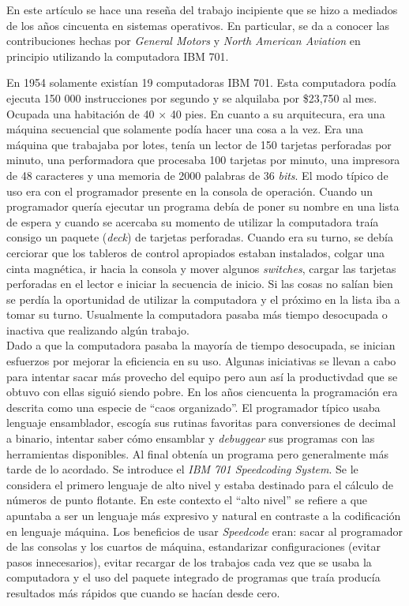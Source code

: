 En este artículo se hace una reseña del trabajo incipiente que se hizo a mediados de los años cincuenta en sistemas operativos. En particular, se da a conocer las contribuciones hechas por \textit{General Motors} y \textit{North American Aviation} en principio utilizando la computadora \textsc{IBM 701}.

En 1954 solamente existían 19 computadoras \textsc{IBM 701}. Esta computadora podía ejecuta 150 000 instrucciones por segundo y se alquilaba por \$23,750 al mes. Ocupada una habitación de 40 $\times$ 40 pies. En cuanto a su arquitecura, era una máquina secuencial que solamente podía hacer una cosa a la vez. Era una máquina que trabajaba por lotes, tenía un lector de 150 tarjetas perforadas por minuto, una performadora que procesaba 100 tarjetas por minuto, una impresora de 48 caracteres y una memoria de 2000 palabras de 36 \textit{bits}. El modo típico de uso era con el programador presente en la consola de operación. Cuando un programador quería ejecutar un programa debía de poner su nombre en una lista de espera y cuando se acercaba su momento de utilizar la computadora traía consigo un paquete (\textit{deck}) de tarjetas perforadas. Cuando era su turno, se debía cerciorar que los tableros de control apropiados estaban instalados, colgar una cinta magnética, ir hacia la consola y mover algunos \textit{switches}, cargar las tarjetas perforadas en el lector e iniciar la secuencia de inicio. Si las cosas no salían bien se perdía la oportunidad de utilizar la computadora y el próximo en la lista iba a tomar su turno. Usualmente la computadora pasaba más tiempo desocupada o inactiva que realizando algún trabajo.\\

Dado a que la computadora pasaba la mayoría de tiempo desocupada, se inician esfuerzos por mejorar la eficiencia en su uso. Algunas iniciativas se llevan a cabo para intentar sacar más provecho del equipo pero aun así la productivdad que se obtuvo con ellas siguió siendo pobre. En los años ciencuenta la programación era descrita como una especie de ``caos organizado''. El programador típico usaba lenguaje ensamblador, escogía sus rutinas favoritas para conversiones de decimal a binario, intentar saber cómo ensamblar y \textit{debuggear} sus programas con las herramientas disponibles. Al final obtenía un programa pero generalmente más tarde de lo acordado. Se introduce el \textit{IBM 701 Speedcoding System}. Se le considera el primero lenguaje de alto nivel y estaba destinado para el cálculo de números de punto flotante. En este contexto el ``alto nivel'' se refiere a que apuntaba a ser un lenguaje más expresivo y natural en contraste a la codificación en lenguaje máquina. Los beneficios de usar \textit{Speedcode} eran: sacar al programador de las consolas y los cuartos de máquina, estandarizar configuraciones (evitar pasos innecesarios), evitar recargar de los trabajos cada vez que se usaba la computadora y el uso del paquete integrado de programas que traía producía resultados más rápidos que cuando se hacían desde cero.


